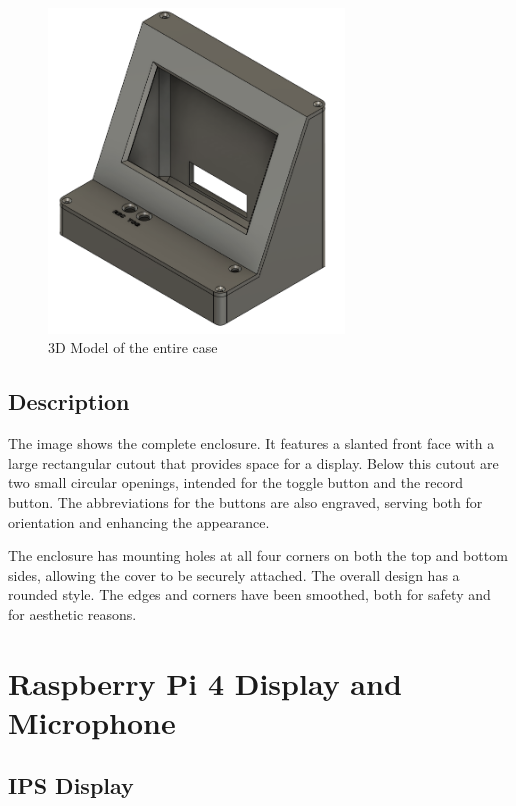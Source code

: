 \begin{figure}[h]
    \centering
    \includegraphics[width=0.7\textwidth]{assets/DG_komplett(1)}
    \caption{3D Model of the entire case}
\end{figure}

\subsection*{Description}

The image shows the complete enclosure. It features a slanted front face with a large rectangular cutout that provides space for a display. Below this cutout are two small circular openings, intended for the toggle button and the record button. The abbreviations for the buttons are also engraved, serving both for orientation and enhancing the appearance.

The enclosure has mounting holes at all four corners on both the top and bottom sides, allowing the cover to be securely attached. The overall design has a rounded style. The edges and corners have been smoothed, both for safety and for aesthetic reasons.

\section{Raspberry Pi 4 Display and Microphone}

\subsection{IPS Display}

